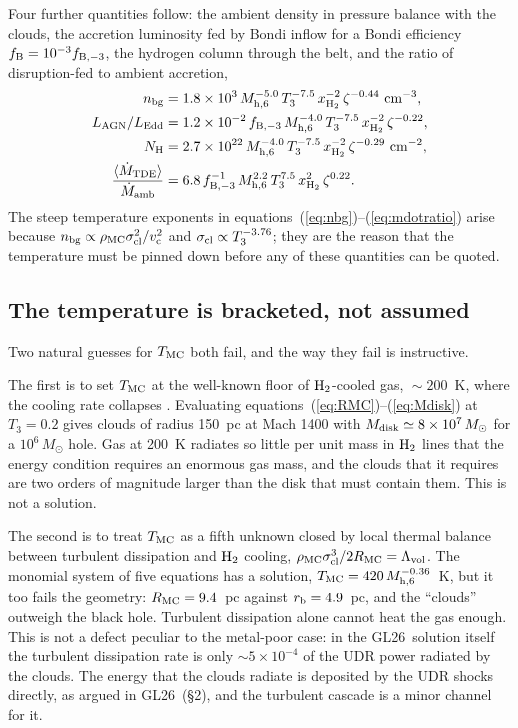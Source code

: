 \documentclass[twocolumn,pdftex]{aastex701}
\newcommand{\msun}{M_{\odot}}
\newcommand{\mhsix}{M_{\rm h,6}}
\newcommand{\Tthree}{T_{3}}
\newcommand{\xhh}{x_{\rm H_2}}
\newcommand{\GL}{GL26}
\newcommand{\Htwo}{{\rm H_2}}
\begin{document}
Four further quantities follow: the ambient density in pressure balance with the clouds, the accretion luminosity fed by Bondi inflow for a Bondi efficiency $f_{\rm B} = 10^{-3}f_{\rm B,-3}$, the hydrogen column through the belt, and the ratio of disruption-fed to ambient accretion,
\begin{align}
n_{\rm bg} &= 1.8\times10^{3}\,\mhsix^{-5.0}\,\Tthree^{-7.5}\,\xhh^{-2}\,\zeta^{-0.44}\ {\rm cm^{-3}}, \label{eq:nbg}\\
L_{\rm AGN}/L_{\rm Edd} &= 1.2\times10^{-2}\,f_{\rm B,-3}\,\mhsix^{-4.0}\,\Tthree^{-7.5}\,\xhh^{-2}\,\zeta^{-0.22}, \label{eq:fEdd}\\
N_{\rm H} &= 2.7\times10^{22}\,\mhsix^{-4.0}\,\Tthree^{-7.5}\,\xhh^{-2}\,\zeta^{-0.29}\ {\rm cm^{-2}}, \label{eq:NH}\\
\frac{\langle\dot M_{\rm TDE}\rangle}{\dot M_{\rm amb}} &= 6.8\,f_{\rm B,-3}^{-1}\,\mhsix^{2.2}\,\Tthree^{7.5}\,\xhh^{2}\,\zeta^{0.22}. \label{eq:mdotratio}
\end{align}
The steep temperature exponents in equations~(\ref{eq:nbg})--(\ref{eq:mdotratio}) arise because $n_{\rm bg}\propto\rho_{\rm MC}\sigma_{\rm cl}^{2}/v_{\rm c}^{2}$ and $\sigma_{\rm cl}\propto\Tthree^{-3.76}$; they are the reason that the temperature must be pinned down before any of these quantities can be quoted.

\subsection{The temperature is bracketed, not assumed}\label{sec:temperature}

Two natural guesses for $T_{\rm MC}$ both fail, and the way they fail is instructive.

The first is to set $T_{\rm MC}$ at the well-known floor of $\Htwo$-cooled gas, $\sim200$~K, where the cooling rate collapses \citep{Bromm:2002a,Abel:2002a}. Evaluating equations~(\ref{eq:RMC})--(\ref{eq:Mdisk}) at $\Tthree = 0.2$ gives clouds of radius 150~pc at Mach 1400 with $M_{\rm disk}\simeq8\times10^{7}\,\msun$ for a $10^{6}\,\msun$ hole. Gas at 200~K radiates so little per unit mass in $\Htwo$ lines that the energy condition requires an enormous gas mass, and the clouds that it requires are two orders of magnitude larger than the disk that must contain them. This is not a solution.

The second is to treat $T_{\rm MC}$ as a fifth unknown closed by local thermal balance between turbulent dissipation and $\Htwo$ cooling, $\rho_{\rm MC}\sigma_{\rm cl}^{3}/2R_{\rm MC} = \Lambda_{\rm vol}$. The monomial system of five equations has a solution, $T_{\rm MC} = 420\,\mhsix^{-0.36}$~K, but it too fails the geometry: $R_{\rm MC} = 9.4$~pc against $r_{\rm b} = 4.9$~pc, and the ``clouds'' outweigh the black hole. Turbulent dissipation alone cannot heat the gas enough. This is not a defect peculiar to the metal-poor case: in the \GL\ solution itself the turbulent dissipation rate is only $\sim5\times10^{-4}$ of the UDR power radiated by the clouds. The energy that the clouds radiate is deposited by the UDR shocks directly, as argued in \GL\ (\S2), and the turbulent cascade is a minor channel for it.
\end{document}

